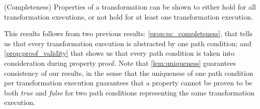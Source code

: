 \begin{proposition}{(Completeness) Properties of a transformation can be shown to either hold for all transformation executions, or not hold for at least one transformation execution.}
\label{prop:proof_completeness}
\end{proposition}
\begin{pf}
This results follows from two previous results: \cref{prop:pc_completeness}, that tells us that every transformation execution is abstracted by one path condition; and \cref{prop:proof_validity} that shows us that every path condition is taken into consideration during property proof. Note that \cref{lem:uniqueness} guarantees consistency of our results, in the sense that the uniqueness of one path condition per transformation execution guarantees that a property cannot be proven to be both \emph{true} and \emph{false} for two path conditions representing the same transformation execution.
\end{pf}

% 
% 
% 
% 


